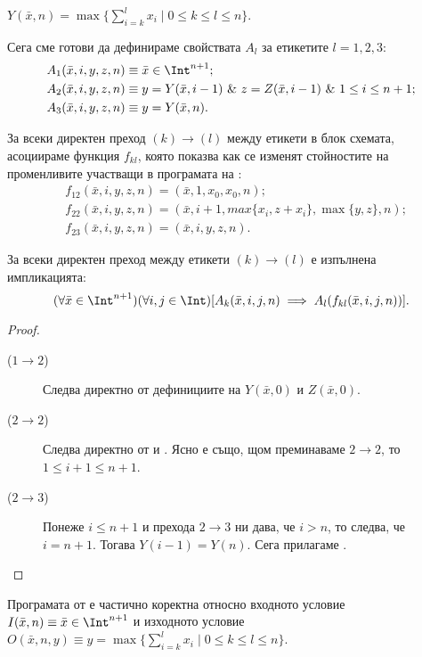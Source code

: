 \begin{cor}
  \label{cr:Y}
  $Y(\bar{x},n) = \max\{\sum^l_{i=k}x_i \mid 0\leq k \leq l \leq n\}$.
\end{cor}

Сега сме готови да дефинираме свойствата $A_l$ за етикетите $l = 1,2,3$:
\begin{align*}
  & A_1(\bar{x},i,y,z,n) \equiv \bar{x} \in \Int^{n+1};\\
  & A_2(\bar{x},i,y,z,n) \equiv y = Y(\bar{x},i-1)\ \&\ z = Z(\bar{x},i-1)\ \&\ 1 \leq i \leq n+1;\\
  & A_3(\bar{x},i,y,z,n) \equiv y = Y(\bar{x},n).
\end{align*}  

За всеки директен преход $(k) \to (l)$ между етикети в блок схемата, асоциираме функция $f_{kl}$,
която показва как се изменят стойностите на променливите участващи в програмата на :
\begin{align*}
  & f_{12}(\bar{x},i,y,z,n) = (\bar{x},1,x_0,x_0,n);\\
  & f_{22}(\bar{x},i,y,z,n) = (\bar{x},i+1,max\{x_i,z+x_i\},\max\{y,z\},n);\\
  & f_{23}(\bar{x},i,y,z,n) = (\bar{x},i,y,z,n).
\end{align*}

\begin{prop}
  За всеки директен преход между етикети $(k) \to (l)$ е изпълнена импликацията:
  \[(\forall\bar{x}\in\Int^{n+1})(\forall i,j\in\Int)[A_k(\bar{x},i,j,n) \implies A_l(f_{kl}(\bar{x},i,j,n))].\]
\end{prop}
\begin{proof}
  \begin{description}
  \item[($1 \to 2$)] 
    Следва директно от дефинициите на $Y(\bar{x},0)$ и $Z(\bar{x},0)$.
  \item[($2 \to 2$)] 
    Следва директно от  и .
    Ясно е също, щом преминаваме $2 \to 2$, то $1 \leq i+1 \leq n+1$.
  \item[($2 \to 3$)] 
    Понеже $i \leq n+1$ и прехода $2\to 3$ ни дава, че $i > n$, 
    то следва, че $i = n+1$. Тогава $Y(i-1) = Y(n)$.
    Сега прилагаме .
  \end{description}
\end{proof}
\begin{cor}
  Програмата от  е частично коректна относно 
  входното условие $I(\bar{x},n) \equiv \bar{x} \in \Int^{n+1}$ и изходното условие $O(\bar{x},n,y) \equiv y = \max\{\sum^l_{i=k}x_i \mid 0\leq k \leq l \leq n\}$.
\end{cor}


